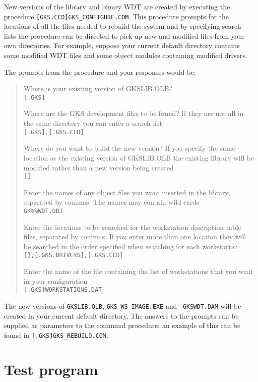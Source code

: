 New versions of the library and binary WDT are created by executing the
procedure {\tt [GKS.CCD]\-GKS\_CONFIGURE.\-COM}. This procedure prompts for the
locations of all the files needed to rebuild the system and by specifying
search lists the procedure can be directed to pick up new and modified files
from your own directories. For example, suppose your current default directory
contains some modified WDT files and some object modules containing modified
drivers.

The prompts from the procedure and your responses would be:
\begin{quote}
Where is your existing version of GKSLIB.OLB?\\
{\tt [.GKS]}

Where are the GKS development files to be found? 
If they are not all in the same directory you can enter a search list\\
{\tt [.GKS],[.GKS.CCD]}

Where do you want to build the new version?
If you specify the same location as the existing version of GKSLIB.OLB the
existing library will be modified rather than a new version being created\\
{\tt []}

Enter the names of any object files you want inserted in the library, separated
by commas.
The names may contain wild cards\\
{\tt GK\%\%WDT.OBJ}

Enter the locations to be searched for the workstation description table files,
separated by commas.
If you enter more than one location they will be searched in the order
specified when searching for each workstation\\
{\tt [],[.GKS.DRIVERS],[.GKS.CCD]}

Enter the name of the file containing the list of workstations that you
want in your configuration\\
{\tt [.GKS]WORKSTATIONS.DAT}
\end{quote}

The new versions of {\tt GKSLIB.OLB}, {\tt GKS\_WS\_IMAGE.EXE} and {\tt 
GKSWDT.DAM} will be created in your current default directory. The answers to
the prompts can be supplied as parameters to the command procedure; an example
of this can be found in {\tt [.GKS]GKS\_REBUILD.COM}.

\section{Test program}

